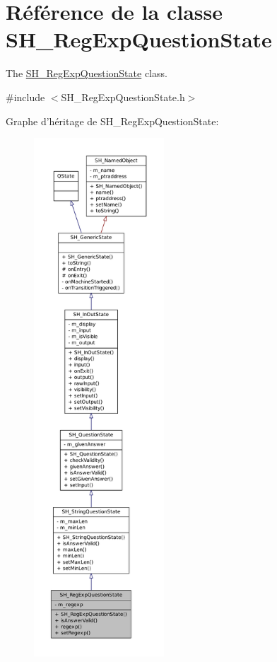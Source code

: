 \hypertarget{classSH__RegExpQuestionState}{\section{Référence de la classe S\-H\-\_\-\-Reg\-Exp\-Question\-State}
\label{classSH__RegExpQuestionState}
}


The \hyperlink{classSH__RegExpQuestionState}{S\-H\-\_\-\-Reg\-Exp\-Question\-State} class.  




{\ttfamily \#include $<$S\-H\-\_\-\-Reg\-Exp\-Question\-State.\-h$>$}



Graphe d'héritage de S\-H\-\_\-\-Reg\-Exp\-Question\-State\-:
\nopagebreak
\begin{figure}[H]
\begin{center}
\leavevmode
\includegraphics[height=550pt]{classSH__RegExpQuestionState__inherit__graph}
\end{center}
\end{figure}


